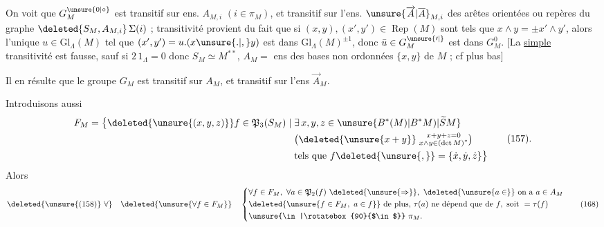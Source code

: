  On voit que $G_M^{\unsure{0|\circ}}$ est transitif sur   ens. $A_{M,i}$ $(i\in\pi_M)$, et   transitif sur l'ens. $\unsure{\overrightarrow A|\overline A}_{M,i}$ des arêtes orientées ou repères du graphe $\deleted{S_M,A_{M,i}}\,\Sigma(i)$ ;
 transitivité provient du fait que si $(x,y),(x',y')\in\operatorname{Rep}(M)$ sont tels que $x\wedge y=\pm x'\wedge y'$, alors l'unique $u\in\mathrm{Gl}_{\Lambda}(M)$ tel que $(x',y')=u.(x\unsure{.|,}y)$ est dans $\mathrm{Gl}_{\Lambda}(M)^{\pm1}$, donc $\bar u\in G_M^{\unsure{\prime|{}}}$ est dans $G_M^0$.
[La \uline{simple} transitivité est fausse, sauf si $2\,1_{\Lambda}=0$ donc $S_M\simeq M^{**}$, $A_M=$ ens des bases non ordonnées $\{x,y\}$ de $M$ ; cf plus bas]

Il en résulte que le groupe $G_M$ est transitif sur $A_M$, et   transitif sur l'ens $\overrightarrow A_M$.

Introduisons aussi 
\[
\begin{aligned}
 F_M=\bigl\{\deleted{\unsure{(x,y,z)}}f\in\mathfrak P_3(S_M)\mid{}&
 \exists\,x,y,z\in\unsure{B^{*}(M)|B^{*}M)|\widetilde S M}\\
 &\bigl(\deleted{\unsure{x+y}}\;\substack{x+y+z=0\\x\wedge y\in(\det M)^*}\bigr)\\
 &\text{tels que } f\deleted{\unsure{,}}=\{\dot x,\dot y,\dot z\}\bigr\}
\end{aligned}\tag*{(157).}
\]
Alors
\[
\begin{aligned}
\deleted{\unsure{(158)}\ \forall}\quad
\deleted{\unsure{\forall f\in F_M}}\quad
\left\{\begin{aligned}
&\forall f\in F_M,\ \forall a\in\mathfrak P_2(f)\ \deleted{\unsure{\Rightarrow}},\
 \deleted{\unsure{a\in}}\ \text{on a }a\in A_M\\
&\deleted{\unsure{f\in F_M,\ a\in f}}\ \text{de plus, }\tau(a)\text{ ne dépend que de }f,\text{ soit }=\tau(f)\\
&\hfill \unsure{\in|\rotatebox{90}{$\in$}}\ \pi_M .
\end{aligned}\right.
\end{aligned}\tag*{(168)}
\]
